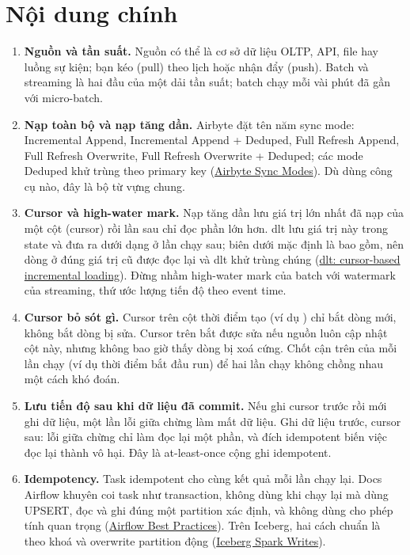 \section{Nội dung chính}
\begin{enumerate}
  \item \textbf{Nguồn và tần suất.} Nguồn có thể là cơ sở dữ liệu OLTP, API, file hay luồng sự kiện; bạn kéo (pull) theo lịch hoặc nhận đẩy (push). Batch và streaming là hai đầu của một dải tần suất; batch chạy mỗi vài phút đã gần với micro-batch.
  \item \textbf{Nạp toàn bộ và nạp tăng dần.} Airbyte đặt tên năm sync mode: Incremental Append, Incremental Append + Deduped, Full Refresh Append, Full Refresh Overwrite, Full Refresh Overwrite + Deduped; các mode Deduped khử trùng theo primary key (\href{https://docs.airbyte.com/platform/using-airbyte/core-concepts/sync-modes}{Airbyte Sync Modes}). Dù dùng công cụ nào, đây là bộ từ vựng chung.
  \item \textbf{Cursor và high-water mark.} Nạp tăng dần lưu giá trị lớn nhất đã nạp của một cột (cursor) rồi lần sau chỉ đọc phần lớn hơn. dlt lưu giá trị này trong state và đưa ra dưới dạng  ở lần chạy sau; biên dưới mặc định là bao gồm, nên dòng ở đúng giá trị cũ được đọc lại và dlt khử trùng chúng (\href{https://dlthub.com/docs/general-usage/incremental/cursor}{dlt: cursor-based incremental loading}). Đừng nhầm high-water mark của batch với watermark của streaming, thứ ước lượng tiến độ theo event time.
  \item \textbf{Cursor bỏ sót gì.} Cursor trên cột thời điểm tạo (ví dụ ) chỉ bắt dòng mới, không bắt dòng bị sửa. Cursor trên  bắt được sửa nếu nguồn luôn cập nhật cột này, nhưng không bao giờ thấy dòng bị xoá cứng. Chốt cận trên của mỗi lần chạy (ví dụ thời điểm bắt đầu run) để hai lần chạy không chồng nhau một cách khó đoán.
  \item \textbf{Lưu tiến độ sau khi dữ liệu đã commit.} Nếu ghi cursor trước rồi mới ghi dữ liệu, một lần lỗi giữa chừng làm mất dữ liệu. Ghi dữ liệu trước, cursor sau: lỗi giữa chừng chỉ làm đọc lại một phần, và đích idempotent biến việc đọc lại thành vô hại. Đây là at-least-once cộng ghi idempotent.
  \item \textbf{Idempotency.} Task idempotent cho cùng kết quả mỗi lần chạy lại. Docs Airflow khuyên coi task như transaction, không dùng  khi chạy lại mà dùng UPSERT, đọc và ghi đúng một partition xác định, và không dùng  cho phép tính quan trọng (\href{https://airflow.apache.org/docs/apache-airflow/stable/best-practices.html}{Airflow Best Practices}). Trên Iceberg, hai cách chuẩn là  theo khoá và overwrite partition động (\href{https://iceberg.apache.org/docs/latest/spark-writes/}{Iceberg Spark Writes}).

\end{enumerate}
